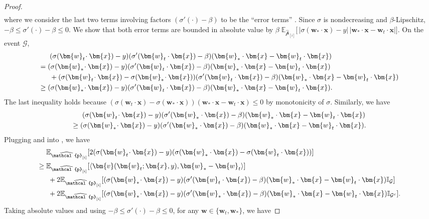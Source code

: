 \documentclass[11pt]{article}
\numberwithin{thm}{section}
\theoremstyle{plain}
\theoremstyle{definition}
\theoremstyle{remark} \newtheorem{remark}[thm]{Remark}
\def\vv{{\bm{v}}}
\def\vw{{\bm{w}}}
\def\vx{{\bm{x}}}
\def\ep{\widehat{\mathcal{p}}}
\def\cG{{\mathcal{G}}}
\newcommand{\E}{\mathbb{E}}
\newcommand{\Ind}{\mathbb{I}}
\newcommand{\innp}[1]{\langle #1 \rangle}
\newcommand{\epi}{\ep_{[i]}}
\begin{document}
\begin{proof}
\begin{align}
	\end{align}
	where we consider the last two terms involving factors $(\sigma'(\cdot)-\beta)$ to be the “error terms” .  Since $\sigma$ is nondecreasing and $\beta$-Lipschitz, $-\beta\le\sigma'(\cdot)-\beta\le0$.  We show that both error terms are bounded in absolute value by
	$\beta\;\E_{\epi}\bigl[\,|\sigma(\vw_*\!\cdot\vx)-y|\,|\vw_*\!\cdot\vx-\vw_t\!\cdot\vx|\bigr]$. On the event $\cG$,
	\begin{align}\label{eq:break-event-g}
		&\; (\sigma(\vw_t\!\cdot\vx)-y)(\sigma'(\vw_t\cdot \vx)-\beta)(\vw_*\cdot \vx-\vw_t\cdot \vx) \notag \\
		=\; &(\sigma(\vw_*\!\cdot\vx)-y)(\sigma'(\vw_t\cdot \vx)-\beta)(\vw_*\cdot \vx-\vw_t\cdot \vx) \notag \\
		&\;+ (\sigma(\vw_t\!\cdot\vx)-\sigma(\vw_*\!\cdot\vx))(\sigma'(\vw_t\cdot \vx)-\beta)(\vw_*\cdot \vx-\vw_t\cdot \vx) \notag \\
		\ge \; & (\sigma(\vw_*\!\cdot\vx)-y)(\sigma'(\vw_t\cdot \vx)-\beta)(\vw_*\cdot \vx-\vw_t\cdot \vx).
	\end{align}
	The last inequality holds because \((\sigma(\vw_t\!\cdot\vx)-\sigma(\vw_*\!\cdot\vx))(\vw_*\cdot \vx-\vw_t\cdot \vx) 
	\le 0\)  by monotonicity of $\sigma$.
	Similarly, we have 
	\begin{align}\label{eq:break-event-g_c}
		&\; (\sigma(\vw_t\!\cdot\vx)-y)(\sigma'(\vw_*\cdot \vx)-\beta)(\vw_*\cdot \vx-\vw_t\cdot \vx) \notag \\
		\ge \; & (\sigma(\vw_*\!\cdot\vx)-y)(\sigma'(\vw_*\cdot \vx)-\beta)(\vw_*\cdot \vx-\vw_t\cdot \vx).
	\end{align}
    Plugging  and  into , we have
    	\begin{align}\label{eq:break-term2-St-cont1}
		& \E_{\epi}[2(\sigma(\vw_t\!\cdot\vx)-y)(\sigma(\vw_*\cdot \vx)-\sigma(\vw_t\cdot \vx))]  \notag\\
        \ge  \; & \E_{\epi}[\innp{\vv(\vw_t;\vx,y), \vw_*-\vw_t}] \notag \\
		&\;+2\E_{\epi}[(\sigma(\vw_*\!\cdot\vx)-y)(\sigma'(\vw_t\cdot \vx)-\beta)(\vw_*\cdot \vx-\vw_t\cdot \vx)\Ind_{\cG}] \notag \\
		&\;+ 2\E_{\epi}[(\sigma(\vw_*\!\cdot\vx)-y)(\sigma'(\vw_*\cdot \vx)-\beta)(\vw_*\cdot \vx-\vw_t\cdot \vx)\Ind_{\cG^{c}}].
	\end{align}
	Taking absolute values and using $-\beta \leq \sigma'(\cdot) - \beta \le 0$, for any \(\vw\in\{\vw_t, \vw_*\}\), we have 

\end{proof}
\end{document}
